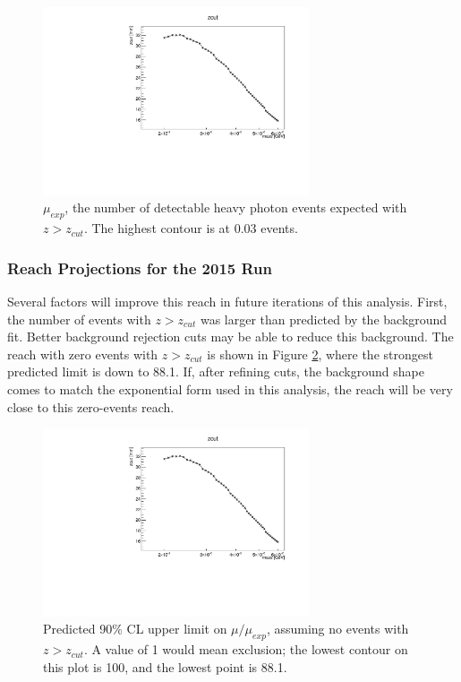 \begin{figure}[ht]
\begin{center}
    \includegraphics[width=0.7\textwidth,page=16,angle=-90]{vertexing/figs/golden_mres_output}
\end{center}
    \caption{$\mu_{exp}$, the number of detectable heavy photon events expected with $z>z_{cut}$. The highest contour is at 0.03 events.}
    \label{fig:detectable}
\end{figure}

\subsubsection{Reach Projections for the 2015 Run}
\label{sec:reach_projections}
Several factors will improve this reach in future iterations of this analysis.
First, the number of events with $z>z_{cut}$ was larger than predicted by the background fit.
Better background rejection cuts may be able to reduce this background.
The reach with zero events with $z>z_{cut}$ is shown in Figure \ref{fig:upper_limit_nosignal}, where the strongest predicted limit is down to 88.1.
If, after refining cuts, the background shape comes to match the exponential form used in this analysis, the reach will be very close to this zero-events reach.

\begin{figure}[ht]
\begin{center}
    \includegraphics[width=0.7\textwidth,page=15,angle=-90]{vertexing/figs/golden_mres_nosignal_output}
\end{center}
\caption{Predicted 90\% CL upper limit on $\mu/\mu_{exp}$, assuming no events with $z>z_{cut}$. A value of 1 would mean exclusion; the lowest contour on this plot is 100, and the lowest point is 88.1.}
    \label{fig:upper_limit_nosignal}
\end{figure}

